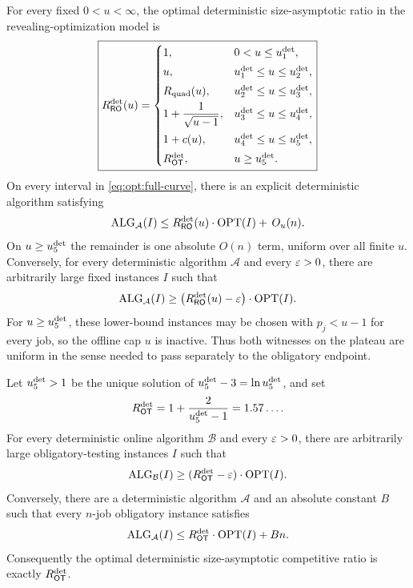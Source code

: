 \begin{theorem}
\label{thm:optional-curve}
For every fixed $0<u<\infty$, the optimal deterministic size-asymptotic ratio in
the revealing-optimization model is
\begin{equation}
\boxed{
R_{\mathsf{RO}}^{\mathrm{det}}(u)=
\begin{cases}
1, &0<u\le u_{1}^{\mathrm{det}},\\[1mm]
u, &u_{1}^{\mathrm{det}}\le u\le u_{2}^{\mathrm{det}},\\[1mm]
R_{\mathrm{quad}}(u), &u_{2}^{\mathrm{det}}\le u\le u_{3}^{\mathrm{det}},\\[1mm]
\displaystyle 1+\frac1{\sqrt{u-1}},
   &u_{3}^{\mathrm{det}}\le u\le u_{4}^{\mathrm{det}},\\[3mm]
1+c(u), &u_{4}^{\mathrm{det}}\le u\le u_{5}^{\mathrm{det}},\\[1mm]
R_{\mathsf{OT}}^{\mathrm{det}}, &u\ge u_{5}^{\mathrm{det}}.
\end{cases}}
\label{eq:opt:full-curve}
\end{equation}
On every interval in \cref{eq:opt:full-curve}, there is an explicit
deterministic algorithm satisfying
\[
 \operatorname{ALG}_{\mathcal A}(I)\le R_{\mathsf{RO}}^{\mathrm{det}}(u)\cdot\operatorname{OPT}(I)+\,O_u(n).
\]
On $u\ge u_{5}^{\mathrm{det}}$ the remainder is one absolute $O(n)$ term, uniform over all
finite $u$.
Conversely, for every deterministic algorithm $\mathcal A$ and every
$\varepsilon>0$, there are arbitrarily large fixed instances $I$ such that
\[
 \operatorname{ALG}_{\mathcal A}(I)
 \ge\bigl(R_{\mathsf{RO}}^{\mathrm{det}}(u)-\varepsilon\bigr)\cdot\operatorname{OPT}(I).
\]
For $u\ge u_{5}^{\mathrm{det}}$, these lower-bound instances may be chosen with
$p_j<u-1$ for every job, so the offline cap $u$ is inactive.  Thus both
witnesses on the plateau are uniform in
the sense needed to pass separately to the obligatory endpoint.
\end{theorem}

\begin{theorem}
\label{thm:det-obligatory}
Let $u_{5}^{\mathrm{det}}>1$ be the unique solution of
$u_{5}^{\mathrm{det}}-3=\ln u_{5}^{\mathrm{det}}$, and set
\[
 R_{\mathsf{OT}}^{\mathrm{det}}=1+\frac{2}{u_{5}^{\mathrm{det}}-1}
 =1.57\ldots .
\]
For every deterministic online algorithm $\mathcal B$ and every $\varepsilon>0$,
there are arbitrarily large obligatory-testing instances $I$ such that
\[
 \operatorname{ALG}_{\mathcal B}(I)\ge(R_{\mathsf{OT}}^{\mathrm{det}}-\varepsilon)\cdot\operatorname{OPT}(I).
\]
Conversely, there are a deterministic algorithm $\mathcal A$ and an absolute
constant $B$ such that every $n$-job obligatory instance satisfies
\[
 \operatorname{ALG}_{\mathcal A}(I)\le R_{\mathsf{OT}}^{\mathrm{det}}\cdot\operatorname{OPT}(I)+Bn.
\]
Consequently the optimal deterministic size-asymptotic competitive ratio is
exactly $R_{\mathsf{OT}}^{\mathrm{det}}$.
\end{theorem}

